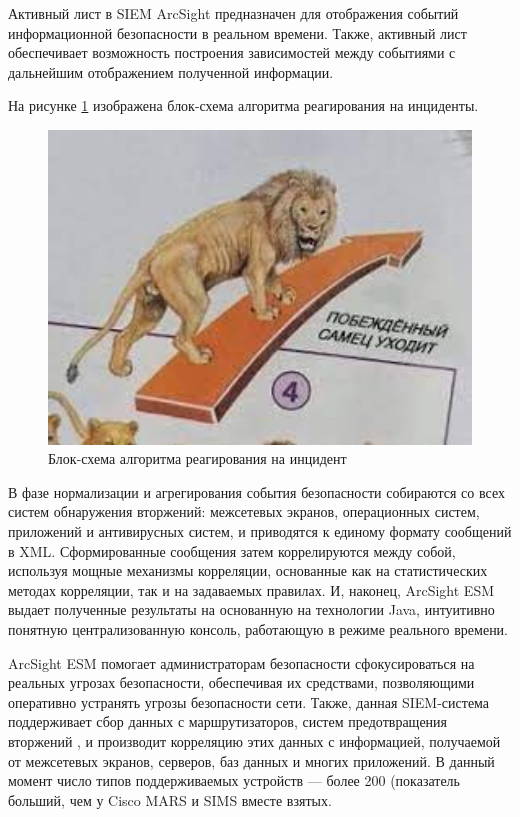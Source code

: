 Активный лист в SIEM ArcSight предназначен для отображения событий информационной безопасности в реальном времени. Также, активный лист обеспечивает возможность построения зависимостей между событиями с дальнейшим отображением полученной информации.

На рисунке \ref{alco} изображена блок-схема алгоритма реагирования на инциденты.
\begin{landscape}
\begin{figure}[H]
  \centering
  \includegraphics[width=1.5\textwidth]{image/13.jpg}
  \caption{Блок-схема алгоритма реагирования на инцидент}
  \label{alco}
\end{figure}
\end{landscape}

В фазе нормализации и агрегирования события безопасности собираются со всех систем обнаружения вторжений: межсетевых экранов, операционных систем, приложений и антивирусных систем, и приводятся к единому формату сообщений в XML. Сформированные сообщения затем коррелируются между собой, используя мощные механизмы корреляции, основанные как на статистических методах корреляции, так и на задаваемых правилах. И, наконец, ArcSight ESM выдает полученные результаты на основанную на технологии Java, интуитивно понятную централизованную консоль, работающую в режиме реального времени.

ArcSight ESM помогает администраторам безопасности сфокусироваться на реальных угрозах безопасности, обеспечивая их средствами, позволяющими оперативно устранять угрозы безопасности сети. Также, данная SIEM-система поддерживает сбор данных с маршрутизаторов, систем предотвращения вторжений , и производит корреляцию этих данных с информацией, получаемой от межсетевых экранов, серверов, баз данных и многих приложений. В данный момент число типов поддерживаемых устройств --- более 200 (показатель больший, чем у Cisco MARS и SIMS вместе взятых.

